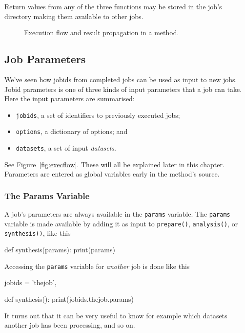 Return values from any of the three functions may be stored in the
job's directory making them available to other jobs.


\begin{figure}[h!]
  \begin{center}
    
    \caption{Execution flow and result propagation in a method.}
    \label{fig:prepanasyn}
  \end{center}
\end{figure}



\subsection{Job Parameters}
\label{sec:jobparams}
We've seen how jobids from completed jobs can be used as input to new
jobs.  Jobid parameters is one of three kinds of input parameters that
a job can take.  Here the input parameters are summarised:
\begin{itemize}
\item[] \texttt{jobids}, a set of identifiers to previously executed jobs;
\item[] \texttt{options}, a dictionary of options; and
\item[] \texttt{datasets}, a set of input \textsl{datasets}.
\end{itemize}
See Figure~\ref{fig:execflow}.  These will all be explained later in
this chapter.  Parameters are entered as global variables early in the
method's source.



\subsubsection*{The Params Variable}
A job's parameters are always available in the \texttt{params}
variable.  The \texttt{params} variable is made available by adding it
as input to \texttt{prepare()}, \texttt{analysis()}, or
\texttt{synthesis()}, like this
\begin{python}
def synthesis(params):
    print(params)
\end{python}
Accessing the \texttt{params} variable for \textsl{another} job is
done like this
\begin{python}
jobids = {'thejob',}

def synthesis():
    print(jobids.thejob.params)
\end{python}
It turns out that it can be very useful to know for example which
datasets another job has been processing, and so on.

